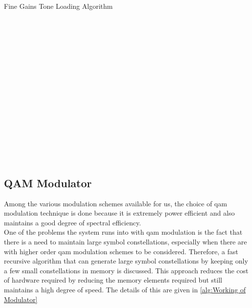 \begin{algorithm}[!htbp]
\caption{Fine Gains Tone Loading Algorithm}
\label{alg:Fine Gains Algorithm}
\begin{algorithmic}
\\
\\
\\
\\
\\
		\\
		\\
		\\
		\\
		\\
		\\
		\\
		\\
		\\
		\\
	\ENDIF
\ENDWHILE
{} 
\end{algorithmic}
\end{algorithm}

\subsection{QAM Modulator}
Among the various modulation schemes available for us, the choice of \acrshort{qam} modulation technique is done because it is extremely power efficient and also maintains a good degree of spectral efficiency.\\

One of the problems the system runs into with \acrshort{qam} modulation is the fact that there is a need to maintain large symbol constellations, especially when there are with higher order \acrshort{qam} modulation schemes to be considered. Therefore, a fast recursive algorithm that can generate large symbol constellations by keeping only a few small constellations in memory is discussed. This approach reduces the cost of hardware required by reducing the memory elements required but still maintains a high degree of speed. The details of this are given in \ref{alg:Working of Modulator}

